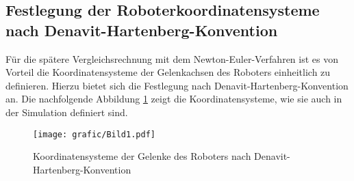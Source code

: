 \subsection{Festlegung der Roboterkoordinatensysteme nach Denavit-Hartenberg-Konvention}

Für die spätere Vergleichsrechnung mit dem Newton-Euler-Verfahren ist es von Vorteil die Koordinatensysteme der Gelenkachsen des Roboters einheitlich zu definieren. %
Hierzu bietet sich die Festlegung nach Denavit-Hartenberg-Konvention an.
Die nachfolgende Abbildung \ref{fig:ur10_dh} zeigt die Koordinatensysteme, wie sie auch in der Simulation definiert sind.

\begin{figure}[!htbp]
	\centering
	\texttt{[image: grafic/Bild1.pdf]}
	\caption{Koordinatensysteme der Gelenke des Roboters nach Denavit-Hartenberg-Konvention}
	\label{fig:ur10_dh}
\end{figure}


